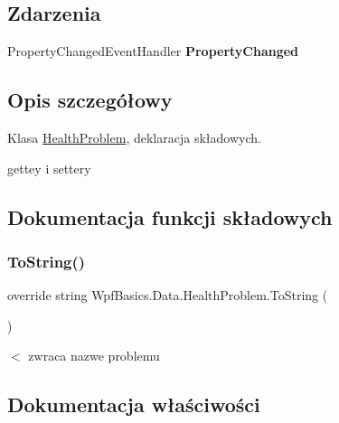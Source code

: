 \subsection*{Zdarzenia}
\begin{DoxyCompactItemize}
\item 
\mbox{\label{class_wpf_basics_1_1_data_1_1_health_problem_af2a436bfdd3a09d529980c52dfaa9f7a}} 
Property\+Changed\+Event\+Handler {\bfseries Property\+Changed}
\end{DoxyCompactItemize}


\subsection{Opis szczegółowy}
Klasa \hyperlink{class_wpf_basics_1_1_data_1_1_health_problem}{Health\+Problem}, deklaracja składowych. 

gettey i settery 

\subsection{Dokumentacja funkcji składowych}
\mbox{\label{class_wpf_basics_1_1_data_1_1_health_problem_af0aa53844c1f023b9653b789a6a5636a}} 
\subsubsection{\texorpdfstring{To\+String()}{ToString()}}
{\footnotesize\ttfamily override string Wpf\+Basics.\+Data.\+Health\+Problem.\+To\+String (\begin{DoxyParamCaption}{ }\end{DoxyParamCaption})}

$<$ zwraca nazwe problemu 

\subsection{Dokumentacja właściwości}
\mbox{\label{class_wpf_basics_1_1_data_1_1_health_problem_a49960c2c156d8143d6b07e21467e8794}} 
